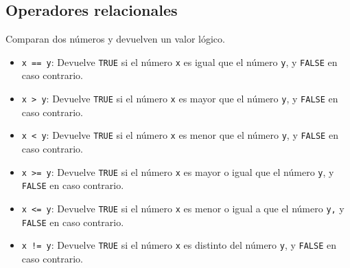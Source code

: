 \documentclass[
  a4paper,
]{scrreport}
\providecommand{\tightlist}{%
  \setlength{\itemsep}{0pt}\setlength{\parskip}{0pt}}\usepackage{longtable,booktabs,array}
\theoremstyle{definition}
\theoremstyle{definition}
\theoremstyle{remark}
\begin{document}
\hypertarget{operadores-relacionales}{%
\subsection{Operadores relacionales}\label{operadores-relacionales}}

Comparan dos números y devuelven un valor lógico.

\begin{itemize}
\tightlist
\item
  \texttt{x\ ==\ y}: Devuelve \texttt{TRUE} si el número \texttt{x} es
  igual que el número \texttt{y}, y \texttt{FALSE} en caso contrario.
\item
  \texttt{x\ \textgreater{}\ y}: Devuelve \texttt{TRUE} si el número
  \texttt{x} es mayor que el número \texttt{y}, y \texttt{FALSE} en caso
  contrario.
\item
  \texttt{x\ \textless{}\ y}: Devuelve \texttt{TRUE} si el número
  \texttt{x} es menor que el número \texttt{y}, y \texttt{FALSE} en caso
  contrario.
\item
  \texttt{x\ \textgreater{}=\ y}: Devuelve \texttt{TRUE} si el número
  \texttt{x} es mayor o igual que el número \texttt{y}, y \texttt{FALSE}
  en caso contrario.
\item
  \texttt{x\ \textless{}=\ y}: Devuelve \texttt{TRUE} si el número
  \texttt{x} es menor o igual a que el número \texttt{y,} y
  \texttt{FALSE} en caso contrario.
\item
  \texttt{x\ !=\ y}: Devuelve \texttt{TRUE} si el número \texttt{x} es
  distinto del número \texttt{y}, y \texttt{FALSE} en caso contrario.
\end{itemize}
\end{document}
